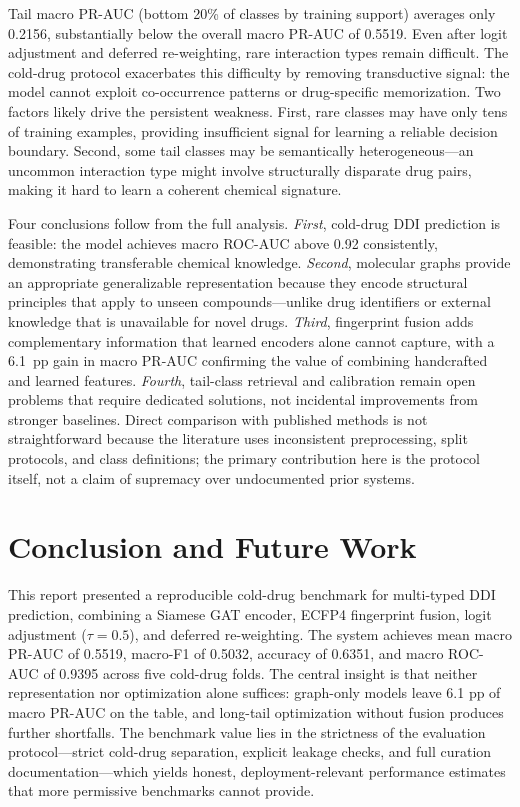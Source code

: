 \documentclass[11pt,a4paper]{report}
\begin{document}
Tail macro PR-AUC (bottom 20\% of classes by training support) averages only 0.2156, substantially below the overall macro PR-AUC of 0.5519. Even after logit adjustment and deferred re-weighting, rare interaction types remain difficult. The cold-drug protocol exacerbates this difficulty by removing transductive signal: the model cannot exploit co-occurrence patterns or drug-specific memorization. Two factors likely drive the persistent weakness. First, rare classes may have only tens of training examples, providing insufficient signal for learning a reliable decision boundary. Second, some tail classes may be semantically heterogeneous---an uncommon interaction type might involve structurally disparate drug pairs, making it hard to learn a coherent chemical signature.

Four conclusions follow from the full analysis. \textit{First}, cold-drug DDI prediction is feasible: the model achieves macro ROC-AUC above 0.92 consistently, demonstrating transferable chemical knowledge. \textit{Second}, molecular graphs provide an appropriate generalizable representation because they encode structural principles that apply to unseen compounds---unlike drug identifiers or external knowledge that is unavailable for novel drugs. \textit{Third}, fingerprint fusion adds complementary information that learned encoders alone cannot capture, with a 6.1~pp gain in macro PR-AUC confirming the value of combining handcrafted and learned features. \textit{Fourth}, tail-class retrieval and calibration remain open problems that require dedicated solutions, not incidental improvements from stronger baselines. Direct comparison with published methods is not straightforward because the literature uses inconsistent preprocessing, split protocols, and class definitions; the primary contribution here is the protocol itself, not a claim of supremacy over undocumented prior systems.

\chapter{Conclusion and Future Work}

This report presented a reproducible cold-drug benchmark for multi-typed DDI prediction, combining a Siamese GAT encoder, ECFP4 fingerprint fusion, logit adjustment ($\tau=0.5$), and deferred re-weighting. The system achieves mean macro PR-AUC of 0.5519, macro-F1 of 0.5032, accuracy of 0.6351, and macro ROC-AUC of 0.9395 across five cold-drug folds. The central insight is that neither representation nor optimization alone suffices: graph-only models leave 6.1 pp of macro PR-AUC on the table, and long-tail optimization without fusion produces further shortfalls. The benchmark value lies in the strictness of the evaluation protocol---strict cold-drug separation, explicit leakage checks, and full curation documentation---which yields honest, deployment-relevant performance estimates that more permissive benchmarks cannot provide.
\end{document}
